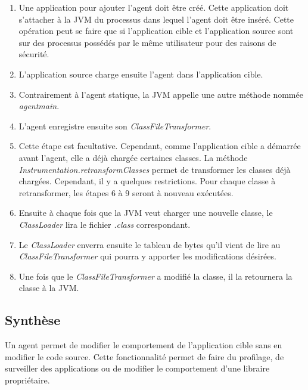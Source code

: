 \begin{enumerate}
    \item Une application pour ajouter l'agent doit être créé. Cette application doit s'attacher à la JVM du processus dans lequel l'agent doit être inséré. Cette opération peut se faire que si l'application cible et l'application source sont sur des processus possédés par le même utilisateur pour des raisons de sécurité.
    \item L'application source charge ensuite l'agent dans l'application cible.
    \item Contrairement à l'agent statique, la JVM appelle une autre méthode nommée \textit{agentmain}.
    \item L'agent enregistre ensuite son \textit{ClassFileTransformer}.
    \item Cette étape est facultative. Cependant, comme l'application cible a démarrée avant l'agent, elle a déjà chargée certaines classes. La méthode \textit{Instrumentation.\hspace{0pt}retransformClasses} permet de transformer les classes déjà chargées. Cependant, il y a quelques restrictions. Pour chaque classe à retransformer, les étapes 6 à 9 seront à nouveau exécutées.
    \item Ensuite à chaque fois que la JVM veut charger une nouvelle classe, le \textit{ClassLoader} lira le fichier \textit{.class} correspondant.
    \item Le \textit{ClassLoader} enverra ensuite le tableau de bytes qu'il vient de lire au \textit{ClassFileTransformer} qui pourra y apporter les modifications désirées.
    \item Une fois que le \textit{ClassFileTransformer} a modifié la classe, il la retournera la classe à la JVM.
\end{enumerate}

\begin{minipage}{\linewidth}
\label{fig:cojac_dynamic_agent}
\end{minipage}

\subsection{Synthèse}

Un agent permet de modifier le comportement de l'application cible sans en modifier le code source. Cette fonctionnalité permet de faire du profilage, de surveiller des applications ou de modifier le comportement d'une libraire propriétaire.

